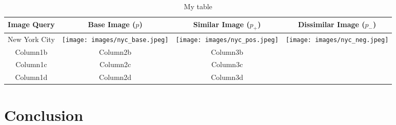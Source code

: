\documentclass[pageno]{jpaper}
\begin{document}
\begin{table}
\begin{tabular}{*{4}{c}}
\toprule
\bfseries Image Query & \bfseries Base Image ($p$) & \bfseries Similar Image ($p_+$) & \bfseries Dissimilar Image ($p_-$) \\
\midrule
\centering New York City & \texttt{[image: images/nyc\_base.jpeg]} & \texttt{[image: images/nyc\_pos.jpeg]} & \texttt{[image: images/nyc\_neg.jpeg]}\\
Column1b & Column2b & Column3b & \\
Column1c & Column2c & Column3c & \\
Column1d & Column2d & Column3d & \\
\bottomrule
\end{tabular}
\caption{My table}
\label{table:random_triplets}
\end{table}

\section{Conclusion}

% 
\pagebreak


\end{document}
